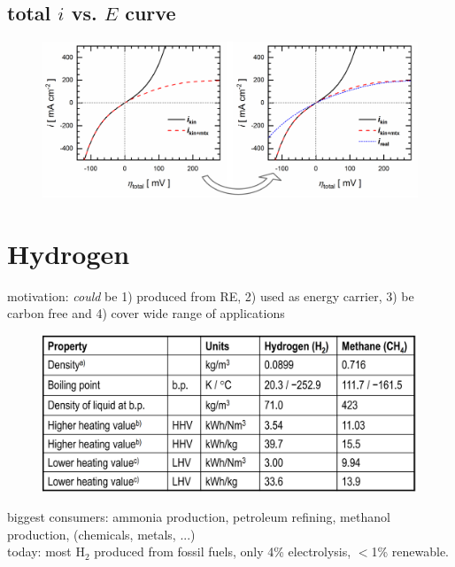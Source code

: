 \documentclass[a4paper,10pt,landscape]{scrartcl}
\begin{document}
\begin{multicols*}{3}
\subsection{total $i$ vs. $E$ curve}
\begin{figure}[H]
    \centering
    \includegraphics[width=1\linewidth]{src/iE_full.png}
\end{figure}

\section{Hydrogen}
motivation: \textit{could} be 1) produced from RE, 2) used as energy carrier, 3) be carbon free and 4) cover wide range of applications
\begin{figure}[H]
    \centering
    \includegraphics[width=1\linewidth]{src/hydrogen_table.png}
\end{figure}
biggest consumers: ammonia production, petroleum refining, methanol production, (chemicals, metals, ...) \\
today: most $\mathrm{H_2}$ produced from fossil fuels, only 4\% electrolysis, $<$1\% renewable. \\


\end{multicols*}
\end{document}

